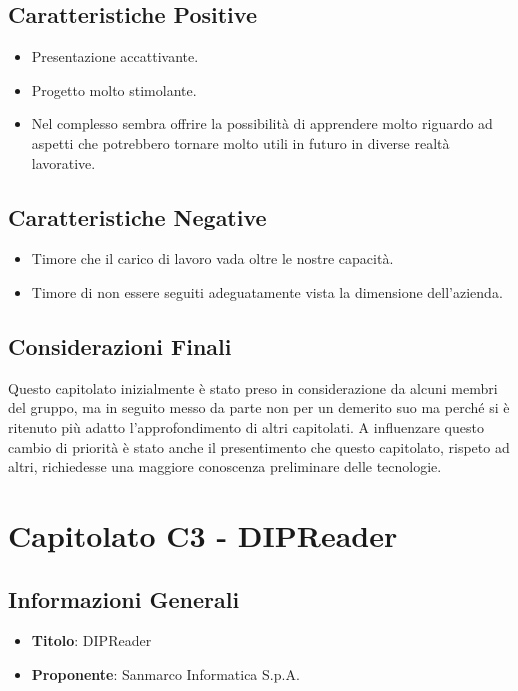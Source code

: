 \documentclass[a4paper,12pt]{article}
\begin{document}
    \subsection{Caratteristiche Positive}
    \begin{itemize}
        \item Presentazione accattivante.
        \item Progetto molto stimolante.
        \item Nel complesso sembra offrire la possibilità di apprendere molto riguardo ad aspetti che potrebbero tornare molto utili in futuro in diverse realtà lavorative. 
    \end{itemize}
    \subsection{Caratteristiche Negative}
        \begin{itemize}
            \item Timore che il carico di lavoro vada oltre le nostre capacità.  
            \item Timore di non essere seguiti adeguatamente vista la dimensione dell'azienda.
        \end{itemize}
    \subsection{Considerazioni Finali}
    Questo capitolato inizialmente è stato preso in considerazione da alcuni membri del gruppo, ma in seguito messo da parte non per un demerito suo ma perché si è ritenuto più adatto l'approfondimento di altri capitolati. A influenzare questo cambio di priorità è stato anche il presentimento che questo capitolato, rispeto ad altri, richiedesse una maggiore conoscenza preliminare delle tecnologie.

    \section{Capitolato C3 - DIPReader} \label{sec:C3}
    \subsection{Informazioni Generali}
        \begin{itemize}
            \item \textbf{Titolo}: DIPReader
            \item \textbf{Proponente}: Sanmarco Informatica S.p.A.
        \end{itemize}
\end{document}
